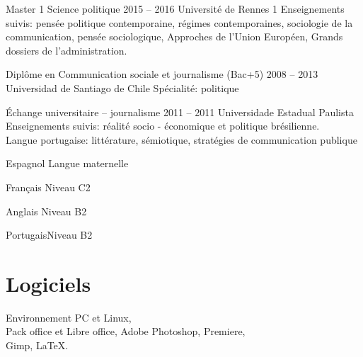 \documentclass[30pt, french]{tccv}
\begin{document}
\begin{upshape}
\begin{education}

\vspace{0.5cm}
\item[Master 1 Science politique]{2015 -- 2016}
     {Université de Rennes 1}
     {Enseignements suivis: pensée politique contemporaine, 
     régimes contemporaines, sociologie de la communication, pensée sociologique, 
     Appro\-ches de l'Union Européen, Grands dossiers de\- l'ad\-mi\-ni\-stra\-tion.}



\vspace{0.5cm}
\item[Diplôme en Communication sociale et journalisme (Bac+5)]{2008 -- 2013}
     {Universidad de Santiago de Chile}
     {Spécialité: politique
     }

 \vspace{0.5cm}    
\item[Échange universitaire -- journalisme]{2011 -- 2011}
     {Universidade Estadual Pau\-li\-sta}
     {Enseignements suivis: réalité socio - é\-co\-no\-mi\-que et politique brésilienne. \\
     Langue portugaise: littérature, sémiotique, stra\-té\-gies de communication publique}


\end{education}


%
%


\begin{competence}

\begin{factlist}
\item{Espagnol} {Langue maternelle}	
\item{Français} {Niveau C2}	
\item{Anglais}  {Niveau B2}	
\item{Portugais}{Niveau B2}
\end{factlist}

\vspace{0.5cm}
\section{Logiciels}
Environnement PC et Linux, \\
Pack office et Libre office,
Adobe Photoshop, Premiere, \\
Gimp,
\LaTeX.


\end{competence}
\end{upshape}
\end{document}
